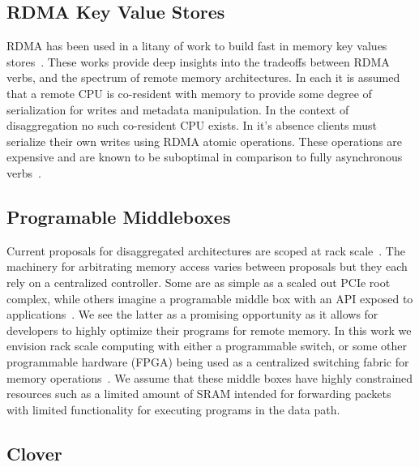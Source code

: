 \subsection{RDMA Key Value Stores}

RDMA has been used in a litany of work to build fast in memory key values
stores~\cite{MemC3,herd,pilaf,sonuma,storm}. These works provide deep insights
into the tradeoffs between RDMA verbs, and the spectrum of remote memory
architectures. In each it is assumed that a remote CPU is co-resident with
memory to provide some degree of serialization for writes and metadata
manipulation. In the context of disaggregation no such co-resident CPU exists.
In it's absence clients must serialize their own writes using RDMA atomic
operations. These operations are expensive and are known to be suboptimal in
comparison to fully asynchronous verbs~\cite{design-guidelines}.

\subsection{Programable Middleboxes}

Current proposals for disaggregated architectures are scoped at rack
scale~\cite{disandapp,beyond,firebox}.  The machinery for arbitrating memory
access varies between proposals but they each rely on a centralized controller.
Some are as simple as a scaled out PCIe root complex, while others imagine a
programable middle box with an API exposed to applications~\cite{disandapp}. We
see the latter as a promising opportunity as it allows for developers to highly
optimize their programs for remote memory.  In this work we envision rack scale
computing with either a programmable switch, or some other programmable hardware
(FPGA) being used as a centralized switching fabric for memory
operations~\cite{supernic}. We assume that these middle boxes have highly
constrained resources such as a limited amount of SRAM intended for forwarding
packets with limited functionality for executing programs in the data path.

\subsection{Clover}

